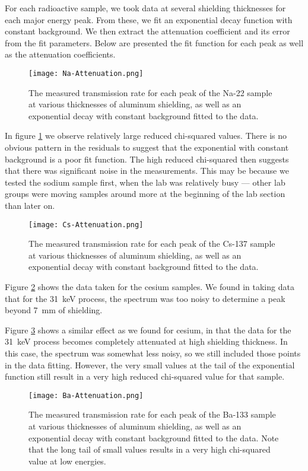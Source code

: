 \documentclass[letter]{article}
\begin{document}
For each radioactive sample, we took data at several shielding thicknesses for each major energy peak. From these, we fit an exponential decay function with constant background. We then extract the attenuation coefficient and its error from the fit parameters. Below are presented the fit function for each peak as well as the attenuation coefficients.

\begin{figure}[h] \centering
    \texttt{[image: Na-Attenuation.png]}
    \caption{The measured transmission rate for each peak of the Na-22 sample at various thicknesses of aluminum shielding, as well as an exponential decay with constant background fitted to the data.}
    \label{fig:NaAtten}
\end{figure}

In figure \ref{fig:NaAtten} we observe relatively large reduced chi-squared values. There is no obvious pattern in the residuals to suggest that the exponential with constant background is a poor fit function. The high reduced chi-squared then suggests that there was significant noise in the measurements. This may be because we tested the sodium sample first, when the lab was relatively busy --- other lab groups were moving samples around more at the beginning of the lab section than later on.

\begin{figure}[h] \centering
    \texttt{[image: Cs-Attenuation.png]}
    \caption{The measured transmission rate for each peak of the Cs-137 sample at various thicknesses of aluminum shielding, as well as an exponential decay with constant background fitted to the data.}
    \label{fig:CsAtten}
\end{figure}

Figure \ref{fig:CsAtten} shows the data taken for the cesium samples. We found in taking data that for the \qty{31}{\kilo\electronvolt} process, the spectrum was too noisy to determine a peak beyond \qty{7}{\mm} of shielding.


Figure \ref{fig:BaAtten} shows a similar effect as we found for cesium, in that the data for the \qty{31}{\kilo\electronvolt} process becomes completely attenuated at high shielding thickness. In this case, the spectrum was somewhat less noisy, so we still included those points in the data fitting. However, the very small values at the tail of the exponential function still result in a very high reduced chi-squared value for that sample.

\begin{figure}[H] \centering
    \texttt{[image: Ba-Attenuation.png]}
    \caption{The measured transmission rate for each peak of the Ba-133 sample at various thicknesses of aluminum shielding, as well as an exponential decay with constant background fitted to the data. Note that the long tail of small values results in a very high chi-squared value at low energies.}
    \label{fig:BaAtten}
\end{figure}
\end{document}
